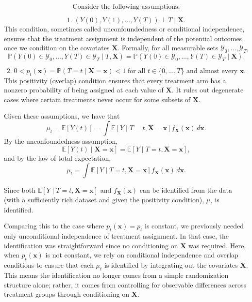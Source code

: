 \documentclass{article}
\begin{document}
\[
\text{Consider the following assumptions:}
\]

\[
1.\; (Y(0), Y(1), \dots, Y(T)) \perp T \mid \mathbf{X}.
\]
This condition, sometimes called unconfoundedness or conditional independence, ensures that the treatment assignment is independent of the potential outcomes once we condition on the covariates \(\mathbf{X}\). Formally, for all measurable sets \(\mathcal{Y}_0, \dots, \mathcal{Y}_T\),
\[
\mathbb{P}(Y(0) \in \mathcal{Y}_0, \dots, Y(T) \in \mathcal{Y}_T \mid T, \mathbf{X}) = \mathbb{P}(Y(0) \in \mathcal{Y}_0, \dots, Y(T) \in \mathcal{Y}_T \mid \mathbf{X}).
\]

\[
2.\; 0 < p_t(\mathbf{x}) = \mathbb{P}(T=t \mid \mathbf{X}=\mathbf{x}) < 1 \; \text{for all } t \in \{0,\dots,T\} \text{ and almost every } \mathbf{x}.
\]
This positivity (overlap) condition ensures that every treatment arm has a nonzero probability of being assigned at each value of \(\mathbf{X}\). It rules out degenerate cases where certain treatments never occur for some subsets of \(\mathbf{X}\).

Given these assumptions, we have that
\[
\mu_t = \mathbb{E}[Y(t)] = \int \mathbb{E}[Y \mid T=t, \mathbf{X}=\mathbf{x}] f_{\mathbf{X}}(\mathbf{x}) \, d\mathbf{x}.
\]
By the unconfoundedness assumption,
\[
\mathbb{E}[Y(t) \mid \mathbf{X}=\mathbf{x}] = \mathbb{E}[Y \mid T=t, \mathbf{X}=\mathbf{x}],
\]
and by the law of total expectation,
\[
\mu_t = \int \mathbb{E}[Y \mid T=t, \mathbf{X}=\mathbf{x}] f_{\mathbf{X}}(\mathbf{x}) \, d\mathbf{x}.
\]

Since both \(\mathbb{E}[Y \mid T=t, \mathbf{X}=\mathbf{x}]\) and \(f_{\mathbf{X}}(\mathbf{x})\) can be identified from the data (with a sufficiently rich dataset and given the positivity condition), \(\mu_t\) is identified.

Comparing this to the case where \(p_t(\mathbf{x})=p_t\) is constant, we previously needed only unconditional independence of treatment assignment. In that case, the identification was straightforward since no conditioning on \(\mathbf{X}\) was required. Here, when \(p_t(\mathbf{x})\) is not constant, we rely on conditional independence and overlap conditions to ensure that each \(\mu_t\) is identified by integrating out the covariates \(\mathbf{X}\). This means the identification no longer comes from a simple randomization structure alone; rather, it comes from controlling for observable differences across treatment groups through conditioning on \(\mathbf{X}\).
  
\end{document}
